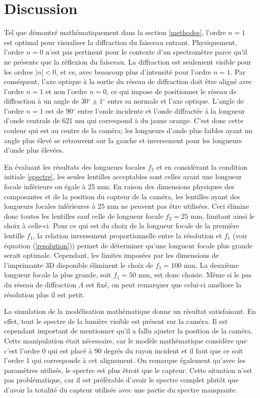 \documentclass[conference]{IEEEtran}
\begin{document}
\section{Discussion}
Tel que démontré mathématiquement dans la section \ref{methodes}, l'ordre $n=1$ est optimal pour visualiser la diffraction
du faisceau entrant. Physiquement, l'ordre $n=0$ n'est pas pertinent pour le contexte d'un spectromètre parce qu'il ne présente que 
la réflexion du faisceau. La diffraction est seulement visible pour les ordres $|n|<0$, et ce, avec beaucoup plus d'intensité pour l'ordre $n=1$.
Par conséquent, l'axe optique à la sortie du réseau de diffraction doit être aligné avec l'ordre $n=1$ et non l'ordre $n=0$, ce qui impose
de positionner le réseau de diffraction à un angle de $30{^\circ}\pm 1{^\circ}$ entre sa normale et l'axe optique. L'angle de l'ordre $n=1$ est de $90{^\circ}$ entre 
l'onde incidente et l'onde diffractée à la longueur d'onde centrale de 621 nm qui correspond à du jaune orange.
C'est donc cette couleur qui est au centre de la caméra; les longueurs d'onde plus faibles ayant un angle  
plus élevé se retrouvent sur la gauche et inversement pour les longueurs d'onde plus élevées.

En évaluant les résultats des longueurs focales $f_2$ et en considérant la condition initiale \ref{spectre}, les seules lentilles acceptables sont celles
ayant une longueur focale inférieure ou égale à 25 mm. En raison des dimensions physiques des composantes et de
la position du capteur de la caméra, les lentilles ayant des longueurs focales inférieures à 25 mm ne peuvent pas être utilisées.
Ceci élimine donc toutes les lentilles sauf celle de longueur focale $f_2=25$ mm, limitant ainsi le choix à celle-ci.
Pour ce qui est du choix de la longueur focale de la première lentille $f_1$, la relation inversement proportionnelle
entre la résolution et $f_1$ (voir équation (\ref{resolution})) permet de déterminer qu'une longueur focale plus grande serait optimale. Cependant,
les limites imposées par les dimensions de l'imprimante 3D disponible éliminent le choix de $f_1=100$ mm. La deuxième longueur focale la plus grande, soit $f_1=50$ mm,
est donc choisie. Même si le pas du réseau de diffraction $\Lambda$ est fixé, on peut remarquer que celui-ci améliore la résolution plus il est petit.

La simulation de la modélisation mathématique donne un résultat satisfaisant. En effet, tout le spectre
de la lumière visible est présent sur la caméra. Il est cependant important de mentionner qu'il a fallu ajuster la
position de la caméra. Cette manipulation était nécessaire, car le modèle mathématique considère que c'est l'ordre 0 qui est placé à 90 degrés du rayon
incident et il faut que ce soit l'ordre 1 qui corresponde à cet alignement. On remarque également qu'avec les paramètres utilisés, le spectre est plus étroit
que le capteur. Cette situation n'est pas problématique, car il est préférable d'avoir le spectre complet plutôt que d'avoir la totalité du capteur utilisée
avec une partie du spectre manquante.
\end{document}
